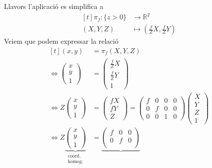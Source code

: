 \documentclass[../main.tex]{subfiles}
\begin{document}
	Llavors l'aplicació es simplifica a
	\begin{displaymath}
		\begin{aligned}[t]
			\pi_f: \{z>0\} &\to \mathbb{R}^2\\
			(X, Y, Z) &\mapsto \left(\frac{f}{Z}X, \frac{f}{Z}Y\right)
		\end{aligned}
	\end{displaymath}
	Veiem que podem expressar la relació
	\begin{displaymath}
		\begin{aligned}[t]
			(x,y) &= \pi_f(X,Y,Z)\\
			\iff \begin{pmatrix}
				x\\y\\1
				\end{pmatrix} &= \begin{pmatrix}
				\frac{f}{Z}X\\\frac{f}{Z}Y\\1
				\end{pmatrix}\\
			\iff Z \begin{pmatrix}
				x\\y\\1
				\end{pmatrix} &= \begin{pmatrix}
				fX\\fY\\Z
				\end{pmatrix}
				= \begin{pmatrix}
				f & 0 & 0 & 0\\
				0 & f & 0 & 0\\
				0 & 0 & 1 & 0
				\end{pmatrix}
				\begin{pmatrix}
				X\\Y\\Z\\1
				\end{pmatrix}\\
			\iff Z \underbrace{\begin{pmatrix}
				x\\y\\1
				\end{pmatrix}}_{\substack{\text{coord.}\\ \text{homog.}}} &= \underbrace{\begin{pmatrix}
				f & 0 & 0\\
				0 & f & 0\\

\end{pmatrix}}
\end{aligned}
\end{displaymath}
\end{document}
